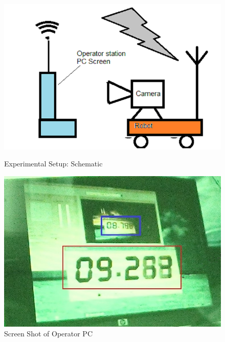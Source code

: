 \begin{figure}
	\begin{minipage}[t]{0.6\textwidth}
		\centering
		\includegraphics[width=\linewidth,scale=2]{Misc_end/fig/DelayExptSetup2}
		\caption{Experimental Setup: Schematic}\label{fig:ExptSetup}
	\end{minipage}
	\hfill
	\begin{minipage}[t]{0.5\textwidth}
		\centering
		\includegraphics[width=\linewidth]{Misc_end/fig/delayMeasureNew2} 
		\caption{Screen Shot of Operator PC}\label{fig:ScreenShot}
	\end{minipage}
\end{figure}
